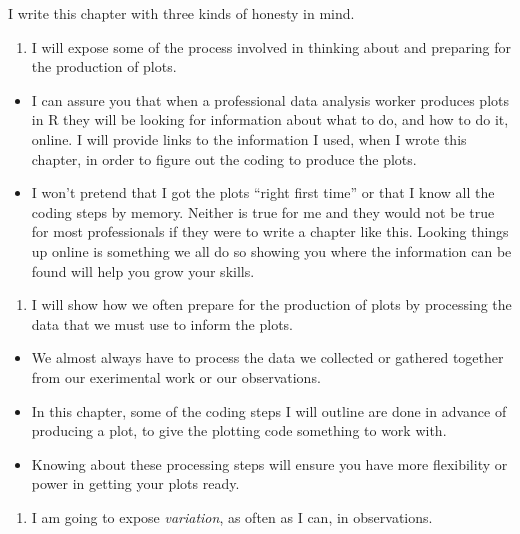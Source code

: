 \documentclass[
  letterpaper,
  DIV=11,
  numbers=noendperiod]{scrreprt}
\providecommand{\tightlist}{%
  \setlength{\itemsep}{0pt}\setlength{\parskip}{0pt}}\usepackage{longtable,booktabs,array}
\begin{document}
I write this chapter with three kinds of honesty in mind.

\begin{enumerate}
\def\labelenumi{\arabic{enumi}.}
\tightlist
\item
  I will expose some of the process involved in thinking about and
  preparing for the production of plots.
\end{enumerate}

\begin{itemize}
\tightlist
\item
  I can assure you that when a professional data analysis worker
  produces plots in R they will be looking for information about what to
  do, and how to do it, online. I will provide links to the information
  I used, when I wrote this chapter, in order to figure out the coding
  to produce the plots.
\item
  I won't pretend that I got the plots ``right first time'' or that I
  know all the coding steps by memory. Neither is true for me and they
  would not be true for most professionals if they were to write a
  chapter like this. Looking things up online is something we all do so
  showing you where the information can be found will help you grow your
  skills.
\end{itemize}

\begin{enumerate}
\def\labelenumi{\arabic{enumi}.}
\setcounter{enumi}{1}
\tightlist
\item
  I will show how we often prepare for the production of plots by
  processing the data that we must use to inform the plots.
\end{enumerate}

\begin{itemize}
\tightlist
\item
  We almost always have to process the data we collected or gathered
  together from our exerimental work or our observations.
\item
  In this chapter, some of the coding steps I will outline are done in
  advance of producing a plot, to give the plotting code something to
  work with.
\item
  Knowing about these processing steps will ensure you have more
  flexibility or power in getting your plots ready.
\end{itemize}

\begin{enumerate}
\def\labelenumi{\arabic{enumi}.}
\setcounter{enumi}{2}
\tightlist
\item
  I am going to expose \emph{variation}, as often as I can, in
  observations.
\end{enumerate}
\end{document}
